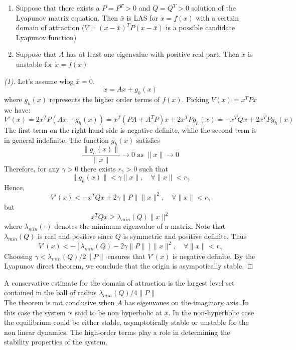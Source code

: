 \documentclass[english]{lectures}
\begin{document}
\begin{theorem}
    \begin{enumerate}
        \item Suppose that there exists a $P=P^T>0$ and $Q=Q^T>0$ solution of the Lyapunov matrix equation. Then $\bar{x}$ is LAS for $\dot{x}=f(x)$ with a certain domain of attraction ($V=(x-\bar{x})^TP(x-\bar{x})$ is a possible candidate Lyapunov function)
        \item Suppose that $A$ has at least one eigenvalue with positive real part. Then $\bar{x}$ is unstable for $\dot{x}=f(x)$ 
    \end{enumerate}
\end{theorem}
\begin{proof}[(1)]
    Let's assume wlog $\bar{x}=0$.
    \[
        \dot{x}=Ax+g_h(x)
    \]
    where $g_h(x)$ represents the higher order terms of $f(x)$. Picking $V(x)=x^TPx$ we have:
    \[
        V'(x)=2x^TP(Ax+g_h(x))=x^T(PA+A^TP)x+2x^TPg_h(x)=-x^TQx+2x^TPg_h(x)
    \]
    The first term on the right-hand side is negative definite, while the second term is in general indefinite. The function $g_h(x)$ satisfies
    \[
        \frac{\|g_h(x)\|}{\|x\|}\to 0 \text{ as } \|x\|\to 0 
    \]
    Therefore, for any $\gamma>0$ there exists $r_\gamma>0$ such that
    \[
        \|g_h(x)\|<\gamma\|x\|, \quad \forall \|x\|<r_\gamma
    \]
    Hence,
    \[
        V'(x)<-x^TQx+2\gamma \|P\|\|x\|^2, \quad \forall \|x\|<r_\gamma
    \]
    but
    \[
        x^TQx\geq \lambda_{min}(Q)\|x\|^2
    \]
    where $\lambda_{min}(\cdot)$ denotes the minimum eigenvalue of a matrix. Note that $\lambda_{min}(Q)$ is real and positive since $Q$ is symmetric and positive definite. Thus
    \[
        V'(x)<-\left[ \lambda_{min}(Q)-2\gamma\|P\| \right]\|x\|^2, \quad \forall \|x\|<r_\gamma
    \]
    Choosing $\gamma<\lambda_{min}(Q)/2\|P\|$ ensures that $V'(x)$ is negative definite. By the Lyapunov direct theorem, we conclude that the origin is asympotically stable.
\end{proof}

\begin{observation}
    A conservative estimate for the domain of attraction is the largest level set contained in the ball of radius $\lambda_{min}(Q)/4\|P\|$\\
    The theorem is not conclusive when $A$ has eigenvaues on the imaginary axis. In this case the system is said to be non hyperbolic at $\bar{x}$. In the non-hyperbolic case the equilibrium could be either stable, asymptotically stable or unstable for the non linear dynamics. The high-order terms play a role in determining the stability properties of the system.
\end{observation}
\end{document}
